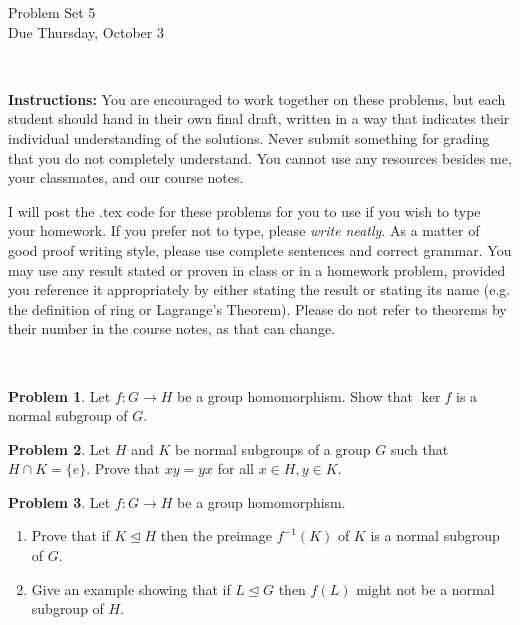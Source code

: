 \documentclass[11pt]{article}
\title{}
\date{\vspace{-0.5in}}
\def\norm{\mathrel{\unlhd}}
\def\norm{\mathrel{\unlhd}}
\theoremstyle{definition}
\newtheorem{problem}{Problem}
\begin{document}
\thispagestyle{fancy}
\pagestyle{fancy}

\vspace{3em}

\begin{center}
	{\LARGE Problem Set 5 \\}
	Due Thursday, October 3
\end{center}

\

\noindent
{\bf Instructions:}
You are encouraged to work together on these problems, but each student should hand in their own final draft, written in a way that indicates their individual understanding of the solutions. Never submit something for grading that you do not completely understand. You cannot use any resources besides me, your classmates, and our course notes.


I will post the .tex code for these problems for you to use if you wish to type your homework. If you prefer not to type, please  {\em write neatly}. As a matter of good proof writing style, please use complete sentences and correct grammar. You may use any result  stated or proven in class or in a homework problem, provided you reference it appropriately by either stating the result or stating its name (e.g. the definition of ring or Lagrange's Theorem). Please do not refer to theorems by their number in the course notes, as that can change.


\





\begin{problem}
	Let $f\!: G \to H$ be a group homomorphism. Show that $\ker f$ is a normal subgroup of $G$.
\end{problem}



\begin{problem}
Let $H$ and $K$ be normal subgroups of a group $G$ such that $H\cap K=\{ e\}$.  Prove that $xy=yx$ for all $x\in H, y\in K$.	
\end{problem}


\begin{problem} 
Let $f\!: G \to H$ be a group homomorphism.
\begin{enumerate}[label=(3.\arabic*)]
\item Prove that if $K\norm H$ then the preimage $f^{-1}(K)$ of $K$ is a normal subgroup of $G$.
\item Give an example showing that if $L \norm G$ then $f(L)$ might not be a normal subgroup of $H$.	
\end{enumerate}
\end{problem}
\end{document}
